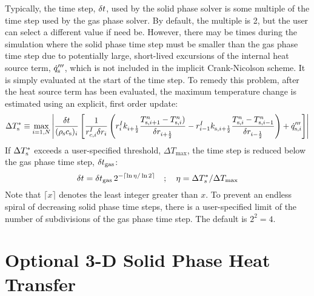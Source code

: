 Typically, the time step, $\delta t$, used by the solid phase solver is some multiple of the time step used by the gas phase solver. By default, the multiple is 2, but the user can select a different value if need be. However, there may be times during the simulation where the solid phase time step must be smaller than the gas phase time step due to potentially large, short-lived excursions of the internal heat source term, $\dot{q}_{\rm s}'''$, which is not included in the implicit Crank-Nicolson scheme. It is simply evaluated at the start of the time step. To remedy this problem, after the heat source term has been evaluated, the maximum temperature change is estimated using an explicit, first order update:
\begin{equation}
  \Delta T_{\rm s}^* \equiv \max_{i=1,N} \left| \frac{\delta t}{(\rho_{\rm s} c_{\rm s})_i} \left[ \frac{1}{r_{c,i}^I \delta r_i} \left( r_{i}^I k_{i+\frac{1}{2}} \frac{T_{{\rm s},i+1}^n-T_{{\rm s},i}^n)}{\delta r_{i+\frac{1}{2}}} - r_{i-1}^I k_{{\rm s},i+\frac{1}{2}} \frac{T_{{\rm s},i}^n-T_{{\rm s},i-1}^n}{\delta r_{i-\frac{1}{2}}} \right) + \dot{q}_{{\rm s},i}''' \right] \right|
\end{equation}
If $\Delta T_{\rm s}^*$ exceeds a user-specified threshold, $\Delta T_{\max}$, the time step is reduced below the gas phase time step, $\delta t_{\rm gas}$:
\begin{equation}
   \delta t = \delta t_{\rm gas} \, 2^{-\lceil \ln \eta / \ln 2 \rceil }  \quad ; \quad \eta = \Delta T_{s}^*  / \Delta T_{\max}
\end{equation}
Note that $\lceil x \rceil$ denotes the least integer greater than $x$. To prevent an endless spiral of decreasing solid phase time steps, there is a user-specified limit of the number of subdivisions of the gas phase time step. The default is $2^2=4$.


\section{Optional 3-D Solid Phase Heat Transfer}

